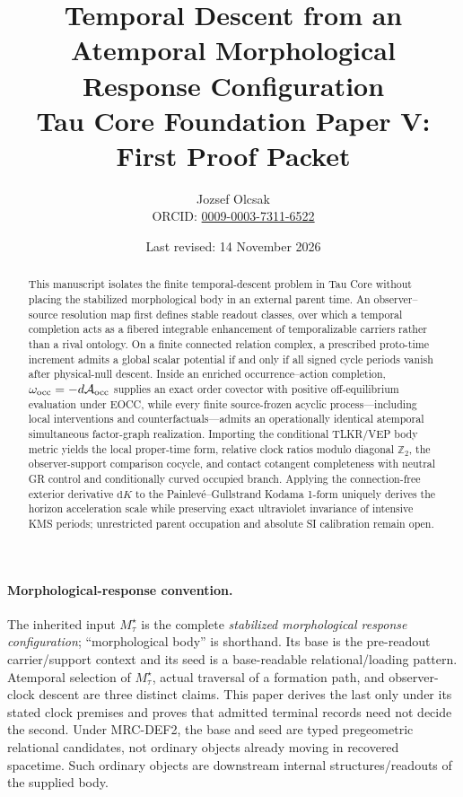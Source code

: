 \documentclass[11pt]{article}
\title{Temporal Descent from an Atemporal Morphological Response Configuration\\
\large Tau Core Foundation Paper V: First Proof Packet}
\author{Jozsef Olcsak\\{\small ORCID: \href{https://orcid.org/0009-0003-7311-6522}{0009-0003-7311-6522}}}
\date{Last revised: 14 November 2026}
\begin{document}
\maketitle

\begin{abstract}
This manuscript isolates the finite temporal-descent problem in Tau Core without placing the stabilized morphological body in an external parent time. An observer--source resolution map first defines stable readout classes, over which a temporal completion acts as a fibered integrable enhancement of temporalizable carriers rather than a rival ontology. On a finite connected relation complex, a prescribed proto-time increment admits a global scalar potential if and only if all signed cycle periods vanish after physical-null descent. Inside an enriched occurrence--action completion, \(\omega_{\rm occ}=-d\mathcal A_{\rm occ}\) supplies an exact order covector with positive off-equilibrium evaluation under EOCC, while every finite source-frozen acyclic process---including local interventions and counterfactuals---admits an operationally identical atemporal simultaneous factor-graph realization. Importing the conditional TLKR/VEP body metric yields the local proper-time form, relative clock ratios modulo diagonal \(\mathbb Z_2\), the observer-support comparison cocycle, and contact cotangent completeness with neutral GR control and conditionally curved occupied branch. Applying the connection-free exterior derivative \(\mathrm{d}K\) to the Painlev\'e--Gullstrand Kodama 1-form uniquely derives the horizon acceleration scale while preserving exact ultraviolet invariance of intensive KMS periods; unrestricted parent occupation and absolute SI calibration remain open.
\end{abstract}

\paragraph{Morphological-response convention.}
The inherited input $M_\tau^\star$ is the complete \emph{stabilized
morphological response configuration}; ``morphological body'' is shorthand.
Its base is the pre-readout carrier/support context and its seed is a
base-readable relational/loading pattern.  Atemporal selection of
$M_\tau^\star$, actual traversal of a formation path, and observer-clock
descent are three distinct claims.  This paper derives the last only under its
stated clock premises and proves that admitted terminal records need not decide
the second.
Under MRC-DEF2, the base and seed are typed pregeometric relational candidates,
not ordinary objects already moving in recovered spacetime. Such ordinary
objects are downstream internal structures/readouts of the supplied body.
\end{document}
